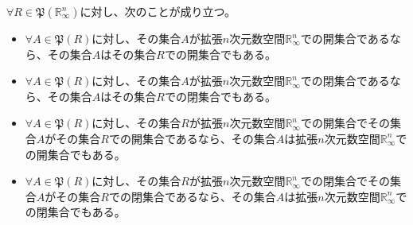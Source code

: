 \documentclass[dvipdfmx]{jsarticle}
\begin{document}
\begin{thm}\label{4.1.3.14}
$\forall R \in \mathfrak{P}\left( \mathbb{R}_{\infty}^{n} \right)$に対し、次のことが成り立つ。
\begin{itemize}
\item
  $\forall A \in \mathfrak{P}(R)$に対し、その集合$A$が拡張$n$次元数空間$\mathbb{R}_{\infty}^{n}$での開集合であるなら、その集合$A$はその集合$R$での開集合でもある。
\item
  $\forall A \in \mathfrak{P}(R)$に対し、その集合$A$が拡張$n$次元数空間$\mathbb{R}_{\infty}^{n}$での閉集合であるなら、その集合$A$はその集合$R$での閉集合でもある。
\item
  $\forall A \in \mathfrak{P}(R)$に対し、その集合$R$が拡張$n$次元数空間$\mathbb{R}_{\infty}^{n}$での開集合でその集合$A$がその集合$R$での開集合であるなら、その集合$A$は拡張$n$次元数空間$\mathbb{R}_{\infty}^{n}$での開集合でもある。
\item
  $\forall A \in \mathfrak{P}(R)$に対し、その集合$R$が拡張$n$次元数空間$\mathbb{R}_{\infty}^{n}$での閉集合でその集合$A$がその集合$R$での閉集合であるなら、その集合$A$は拡張$n$次元数空間$\mathbb{R}_{\infty}^{n}$での閉集合でもある。
\end{itemize}
\end{thm}
\end{document}
